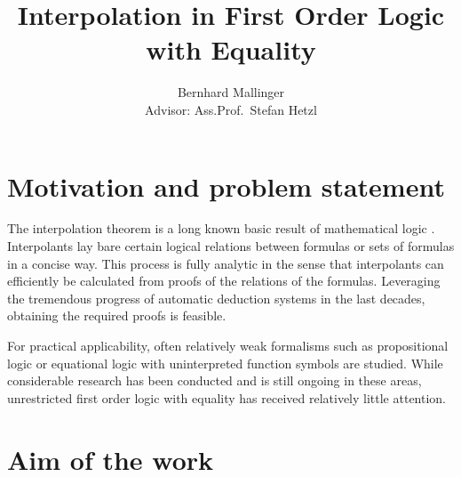 \documentclass[,%
			paper=a4,%
			DIV10,
			liststotoc,
			bibtotoc,
			draft=false,%
			numbers=noendperiod
			]{scrartcl}
\title{Interpolation in First Order Logic with Equality}
\author{Bernhard Mallinger\medskip \\
Advisor: Ass.Prof.\ Stefan Hetzl}
\begin{document}
\maketitle

\section{Motivation and problem statement}
\label{motivation}


The interpolation theorem is a long known basic result of mathematical logic \cite{craig57linear}.  Interpolants lay bare certain logical relations between formulas or sets of formulas in a concise way. 
This process is fully analytic in the sense that interpolants can efficiently be calculated from proofs of the relations of the formulas.
Leveraging the tremendous progress of automatic deduction systems in the last decades, obtaining the required proofs is feasible.

For practical applicability, often relatively weak formalisms such as propositional logic or equational logic with uninterpreted function symbols are studied. 
While considerable research has been conducted and is still ongoing in these areas, unrestricted first order logic with equality has received relatively little attention. 





\begin{comment}
Software verification
Model checking
Derive invariants
interpolation by its nature disregards all but the predicates relevant to a certain property
can be used for predicate refinement in cegar

often restricted to weaker logics, application to more powerful formalisms such as fol with equality is relevant 
\end{comment}

\section{Aim of the work}

\end{document}
